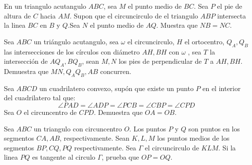 \documentclass[11pt]{scrartcl}
\newcommand{\gad}{\textcolor{yellow}{$\bigstar$}}
\newcommand{\thmdifficulty}{0}
\newcommand{\problemdiff}[1]{\renewcommand{\thmdifficulty}{#1}}
\begin{document}
\problemdiff{4}
\begin{problem}  [\gad]
    En un triangulo acutangulo $ABC$, sea $M$ el punto medio de $BC$. Sea $P$ el pie de altura de $C$ hacia $AM$. Supon que el circuncirculo de el triangulo $ABP$ intersecta la linea $BC$ en $B$ y $Q$.Sea $N$ el punto medio de $AQ$. Muestra que $NB=NC$.
\end{problem}
\problemdiff{4}
\begin{problem} %
    Sea $ABC$ un triángulo acutangulo, sea $\omega$ el circuncirculo,  $H$ el ortocentro, $Q_A, Q_B$ las intersecciones de los círculos con diámetro $AH, BH$ con $\omega$ , sea $T$ la intersección de $AQ_A, BQ_B$, sean $M,N$ los pies de perpendicular de $T$ a $AH,BH$.
Demuestra que $MN, Q_AQ_B,AB$ concurren.
\end{problem}
\problemdiff{4.5}
\begin{problem}
    Sea $ABCD$ un cuadrilatero convexo, supón que existe un punto $P$ en el interior del cuadrilatero tal que: 
    \[\angle PAD= \angle ADP = \angle PCB  = \angle CBP = \angle CPD\]
    Sea $O$ el circuncentro de $CPD$. Demuestra que $OA=OB$.
\end{problem}

\problemdiff{5.5}
\begin{problem}
    Sea $ABC$ un triangulo con circuncentro $O$. Los puntos $P$ y $Q$ son puntos en los segmentos $CA,AB$, respectivamente. Sean $K,L,M$ los puntos medios de los segmentos $BP,CQ,PQ$ respectivamente. Sea $\Gamma$ el circuncirculo de $KLM$. Si la linea $PQ$ es tangente al circulo $\Gamma$, prueba que $OP=OQ$.
\end{problem}
\end{document}
